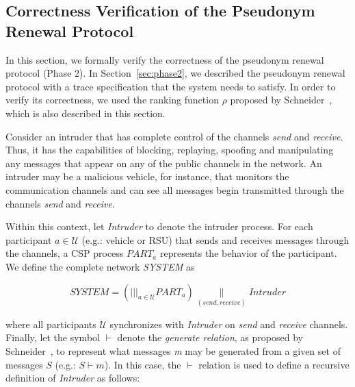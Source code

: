 \documentclass[preprint,12pt]{elsarticle}
\begin{document}

\subsection{Correctness Verification of the Pseudonym Renewal Protocol}
\label{sec:authenticationCorrectness}

In this section, we formally verify the correctness of the pseudonym renewal protocol (Phase 2). In Section~\ref{sec:phase2}, we described the pseudonym renewal protocol with a trace specification that the system needs to satisfy. In order to verify its correctness, we used the ranking function $\rho$ proposed by Schneider~\cite{schneider1996security}, which is also described in this section.

Consider an intruder that has complete control of the channels \textit{send} and \textit{receive}. Thus, it has the capabilities of blocking, replaying, spoofing and manipulating any messages that appear on any of the public channels in the network. An intruder may be a malicious vehicle, for instance, that monitors the communication channels and can see all messages begin transmitted through the channels \textit{send} and \textit{receive}.

Within this context, let \textit{Intruder} to denote the intruder process. For each participant $a \in \mathcal{U}$ (e.g.: vehicle or RSU) that sends and receives messages through the channels, a CSP process $PART_{a}$ represents the behavior of the participant. We define the complete network \textit{SYSTEM}  as

\begin{equation}
SYSTEM = (|||_{a \in \mathcal{U}} PART_a) \underset{(send, receive)}{\|} Intruder
\end{equation}

where all participants $\mathcal{U}$ synchronizes with \textit{Intruder} on \textit{send} and \textit{receive} channels. Finally, let the symbol $\vdash$ denote the \textit{generate relation}, as proposed by Schneider~\cite{schneider1998verifying}, to represent what messages \textit{m} may be generated from a given set of messages $S$ (e.g.: $S \vdash m$). In this case, the $\vdash$ relation is used to define a recursive definition of \textit{Intruder} as follows:
\end{document}
